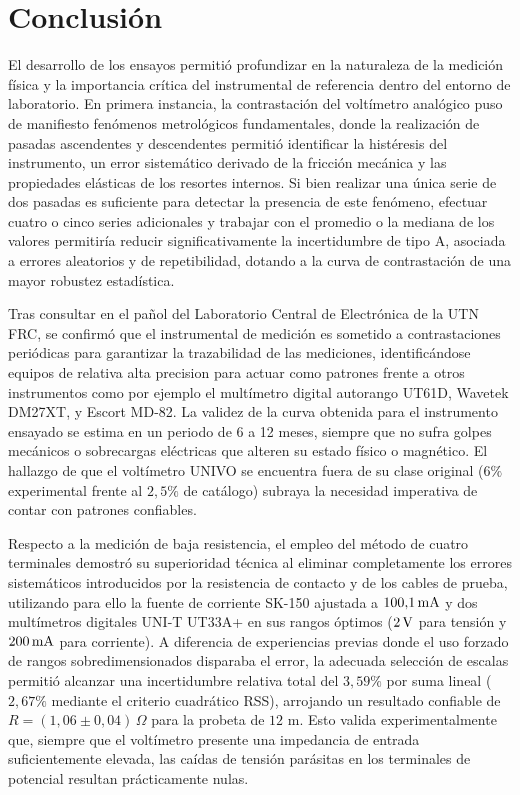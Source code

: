 \chapter{Conclusión}

El desarrollo de los ensayos permitió profundizar en la naturaleza de la medición física y la 
importancia crítica del instrumental de referencia dentro del entorno de laboratorio. En primera instancia, la 
contrastación del voltímetro analógico puso de manifiesto fenómenos metrológicos fundamentales, donde la realización 
de pasadas ascendentes y descendentes permitió identificar la histéresis del instrumento, un error sistemático derivado
de la fricción mecánica y las propiedades elásticas de los resortes internos. Si bien realizar una única serie de dos
pasadas es suficiente para detectar la presencia de este fenómeno, efectuar cuatro o cinco series adicionales y 
trabajar con el promedio o la mediana de los valores permitiría reducir significativamente la incertidumbre de tipo A,
asociada a errores aleatorios y de repetibilidad, dotando a la curva de contrastación de una mayor robustez 
estadística.

Tras consultar en el pañol del Laboratorio Central de Electrónica de la UTN FRC, se confirmó que el
instrumental de medición es sometido a contrastaciones periódicas para garantizar la trazabilidad de las mediciones,
identificándose equipos de relativa alta precision para actuar como patrones frente a otros instrumentos como por
ejemplo el multímetro digital autorango UT61D, Wavetek DM27XT, y Escort MD-82. La validez de la curva obtenida para el 
instrumento ensayado se estima en un periodo de 6 a 12 meses, siempre que no sufra golpes mecánicos o sobrecargas
eléctricas que alteren su estado físico o magnético. El hallazgo de que el voltímetro UNIVO se encuentra fuera de su 
clase original ($6\%$ experimental frente al $2,5\%$ de catálogo) subraya la necesidad imperativa de contar con patrones
confiables. 

Respecto a la medición de baja resistencia, el empleo del método de cuatro terminales
demostró su superioridad técnica al eliminar completamente los errores sistemáticos introducidos por la resistencia de contacto y de los 
cables de prueba, utilizando para ello la fuente de corriente SK-150 ajustada a $100{,}1\,\mathrm{mA}$ y dos multímetros digitales UNI-T UT33A+ en sus rangos óptimos ($2\,\mathrm{V}$ para tensión y $200\,\mathrm{mA}$ para corriente). A diferencia de experiencias previas donde el uso forzado de rangos sobredimensionados disparaba el error, la adecuada selección de escalas permitió alcanzar una incertidumbre relativa total del $3{,}59\%$ por suma lineal ($2{,}67\%$ mediante el criterio cuadrático RSS), arrojando un resultado confiable de $R = (1{,}06 \pm 0{,}04)\,\Omega$ para la probeta de $12\text{ m}$. Esto valida experimentalmente que, siempre que el voltímetro presente una impedancia de entrada suficientemente elevada, las caídas de tensión parásitas en los terminales de potencial resultan prácticamente nulas.

